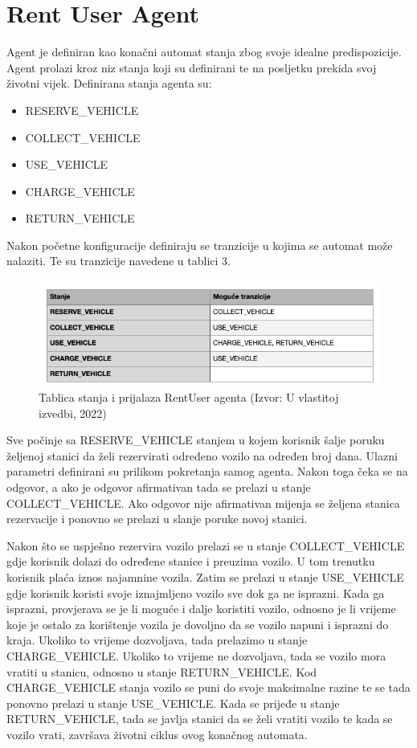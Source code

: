 \documentclass{foi}
\begin{document}
\pagebreak

\section{Rent User Agent}

Agent je definiran kao konačni automat stanja zbog svoje idealne predispozicije. Agent prolazi kroz niz stanja koji su definirani te na posljetku prekida svoj životni vijek. Definirana stanja agenta su:
\begin{itemize}
	\item RESERVE\_VEHICLE
	\item COLLECT\_VEHICLE
	\item USE\_VEHICLE
	\item CHARGE\_VEHICLE
	\item RETURN\_VEHICLE
\end{itemize}

Nakon početne konfiguracije definiraju se tranzicije u kojima se automat može nalaziti. Te su tranzicije navedene u tablici 3.

\begin{figure}[h!]
	\centering
	\includegraphics[width=1\textwidth]{slike/tablica3.png}
	\caption{Tablica stanja i prijalaza RentUser agenta (Izvor: U vlastitoj izvedbi, 2022)}
\end{figure}

Sve počinje sa RESERVE\_VEHICLE stanjem u kojem korisnik šalje poruku željenoj stanici da želi rezervirati određeno vozilo na određen broj dana. Ulazni parametri definirani su prilikom pokretanja samog agenta. Nakon toga čeka se na odgovor, a ako je odgovor afirmativan tada se prelazi u stanje COLLECT\_VEHICLE. Ako odgovor nije afirmativan mijenja se željena stanica rezervacije i ponovno se prelazi u slanje poruke novoj stanici. 

Nakon što se uspješno rezervira vozilo prelazi se u stanje COLLECT\_VEHICLE gdje korisnik dolazi do određene stanice i preuzima vozilo. U tom trenutku korisnik plaća iznos najamnine vozila. Zatim se prelazi u stanje USE\_VEHICLE gdje korisnik koristi svoje iznajmljeno vozilo sve dok ga ne isprazni. Kada ga isprazni, provjerava se je li moguće i dalje koristiti vozilo, odnosno je li vrijeme koje je ostalo za korištenje vozila je dovoljno da se vozilo napuni i isprazni do kraja. Ukoliko to vrijeme dozvoljava, tada prelazimo u stanje CHARGE\_VEHICLE. Ukoliko to vrijeme ne dozvoljava, tada se vozilo mora vratiti u stanicu, odnosno u stanje RETURN\_VEHICLE. Kod CHARGE\_VEHICLE stanja vozilo se puni do svoje maksimalne razine te se tada ponovno prelazi u stanje USE\_VEHICLE. Kada se prijeđe u stanje RETURN\_VEHICLE, tada se javlja stanici da se želi vratiti vozilo te kada se vozilo vrati, završava životni ciklus ovog konačnog automata.
\end{document}
